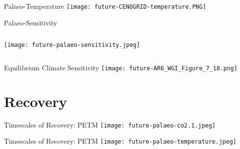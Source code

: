 \begin{frame}{Palaeo-Temperature}
    \centering
    \texttt{[image: future-CENOGRID-temperature.PNG]}
\end{frame}

\begin{frame}{Palaeo-Sensitivity}
    \begin{columns}
        \begin{column}{0.5\linewidth}
            \texttt{[image: future-palaeo-sensitivity.jpeg]}
        \end{column}
    \end{columns}
\end{frame}

\begin{frame}{Equilibrium Climate Sensitivity}
    \centering
    \texttt{[image: future-AR6\_WGI\_Figure\_7\_18.png]}

\end{frame}

\section{Recovery}

\begin{frame}{Timescales of Recovery: PETM}
    \centering
    \texttt{[image: future-palaeo-co2.1.jpeg]}
\end{frame}

\begin{frame}{Timescales of Recovery: PETM}
    \centering
    \texttt{[image: future-palaeo-temperature.jpeg]}
\end{frame}


